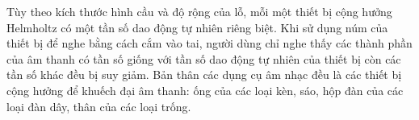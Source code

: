 \begin{multicols}{2}
	\vskip 0.2cm
	\vskip 0.2cm
	Tùy theo kích thước hình cầu và độ rộng của lỗ, mỗi một thiết bị cộng hưởng Helmholtz có một tần số dao động tự nhiên riêng biệt. Khi sử dụng núm của thiết bị để nghe bằng cách cắm vào tai, người dùng chỉ nghe thấy các thành phần của âm thanh có tần số giống với tần số dao động tự nhiên của thiết bị còn các tần số khác đều bị suy giảm.
	Bản thân các dụng cụ âm nhạc đều là các thiết bị cộng hưởng để khuếch đại âm thanh: ống của các loại kèn, sáo, hộp đàn của các loại đàn dây, thân của các loại trống. 

\end{multicols}
